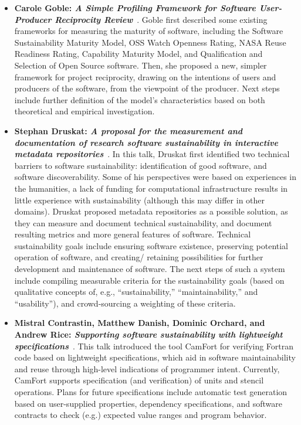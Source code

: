 \documentclass[11pt, oneside]{amsart}
\begin{document}
\begin{itemize}[itemsep=1ex]
    \item \textbf{Carole Goble: \emph{A Simple Profiling Framework for Software
    User-Producer Reciprocity Review}}~\cite{Goble:2016ws}.
    Goble first described some existing frameworks for measuring the maturity of
    software, including the Software Sustainability Maturity Model, OSS Watch
    Openness Rating, NASA Reuse Readiness Rating, Capability Maturity Model, and
    Qualification and Selection of Open Source software. Then, she proposed a new,
    simpler framework for project reciprocity, drawing on the intentions of users
    and producers of the software, from the viewpoint of the producer.
    Next steps include further definition of the model's characteristics based on
    both theoretical and empirical investigation.

    \item \textbf{Stephan Druskat: \emph{A proposal for the measurement and
    documentation of research software sustainability in interactive metadata
    repositories}}~\cite{Druskat:2016ws}.
    In this talk, Druskat first identified two technical barriers to software
    sustainability: identification of good software, and software discoverability.
    Some of his perspectives were based on experiences in the humanities, a lack
    of funding for computational infrastructure results in little experience with
    sustainability (although this may differ in other domains). Druskat proposed
    metadata repositories as a possible solution, as they can measure and document
    technical sustainability, and document resulting metrics and more general
    features of software. Technical sustainability goals include ensuring software
    existence, preserving potential operation of software, and creating\slash
    retaining possibilities for further development and maintenance of software.
    The next steps of such a system include compiling measurable criteria for
    the sustainability goals (based on qualitative concepts of, e.g.,
    ``sustainability,'' ``maintainability,'' and ``usability''), and
    crowd-sourcing a weighting of these criteria.

    \item \textbf{Mistral Contrastin, Matthew Danish,
    Dominic Orchard\textsuperscript{\textasteriskcentered}, and
    Andrew Rice: \emph{Supporting software sustainability with
    lightweight specifications}}~\cite{Contrastin:2016ws}.
    This talk introduced the tool CamFort for verifying Fortran code based on
    lightweight specifications, which aid in software maintainability and reuse
    through high-level indications of programmer intent.
    Currently, CamFort supports specification (and
    verification) of units and stencil operations. Plans for future specifications
    include automatic test generation based on user-supplied properties, dependency
    specifications, and software contracts to check (e.g.) expected value ranges
    and program behavior.


\end{itemize}
\end{document}
